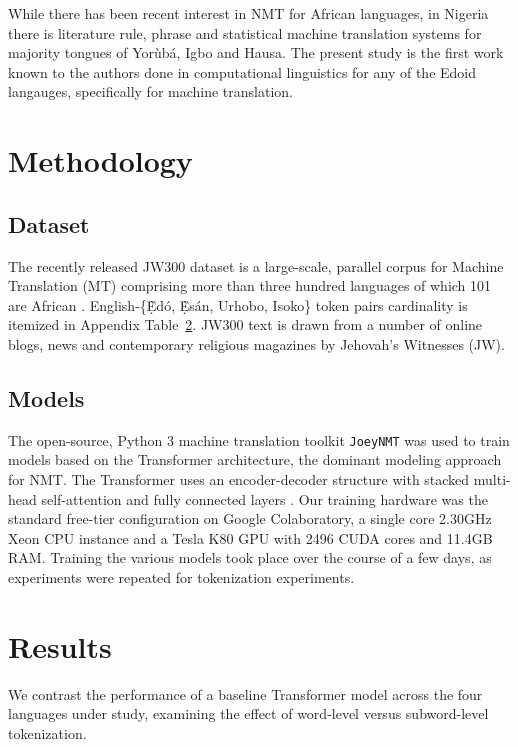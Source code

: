 \documentclass{article} %
\begin{document}
While there has been recent interest in NMT for African languages, in Nigeria there is literature rule, phrase and statistical machine translation systems for majority tongues of Yor{\`u}b{\'a}, Igbo and Hausa. The present study is the first work known to the authors done in computational linguistics for any of the Edoid langauges, specifically for machine translation.


\section{Methodology}
\label{methods}

\subsection{Dataset}
The recently released JW300 dataset is a large-scale, parallel corpus for Machine Translation (MT) comprising more than three hundred languages of which 101 are African \citep{agic-vulic-2019-jw300}. English-\{\d{\`E}d{\'o}, \d{\`E}s{\'a}n, Urhobo, Isoko\} token pairs cardinality is itemized in Appendix Table~\ref{results}. JW300 text is drawn from a number of online blogs, news and contemporary religious magazines by Jehovah's Witnesses (JW).

\subsection{Models}
The open-source, Python 3 machine translation toolkit \texttt{JoeyNMT} was used to train models based on the Transformer architecture, the dominant modeling approach for NMT. The Transformer uses an encoder-decoder structure with stacked multi-head self-attention and fully connected layers \citep{JoeyNMT, NIPS2017_7181}. Our training hardware was the standard free-tier configuration on Google Colaboratory, a single core 2.30GHz Xeon CPU instance and a Tesla K80 GPU with 2496 CUDA cores and 11.4GB RAM. Training the various models took place over the course of a few days, as experiments were repeated for tokenization experiments.

\section{Results}
\label{results}

We contrast the performance of a baseline Transformer model across the four languages under study, examining the effect of word-level versus subword-level tokenization.
\end{document}
